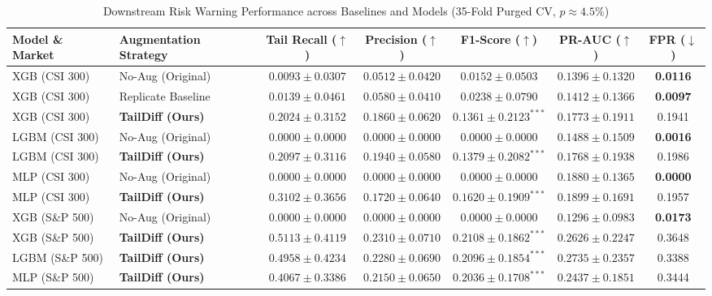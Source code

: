 \begin{table}[htbp]
\centering
\caption{Downstream Risk Warning Performance across Baselines and Models (35-Fold Purged CV, $p \approx 4.5\%$)}
\label{tab:downstream_performance}
\small
\begin{tabular}{llccccc}
\hline
\textbf{Model \& Market} & \textbf{Augmentation Strategy} & \textbf{Tail Recall ($\uparrow$)} & \textbf{Precision ($\uparrow$)} & \textbf{F1-Score ($\uparrow$)} & \textbf{PR-AUC ($\uparrow$)} & \textbf{FPR ($\downarrow$)} \\ \hline
XGB (CSI 300) & No-Aug (Original) & $0.0093 \pm 0.0307$ & $0.0512 \pm 0.0420$ & $0.0152 \pm 0.0503$ & $0.1396 \pm 0.1320$ & \textbf{0.0116} \\
XGB (CSI 300) & Replicate Baseline & $0.0139 \pm 0.0461$ & $0.0580 \pm 0.0410$ & $0.0238 \pm 0.0790$ & $0.1412 \pm 0.1366$ & \textbf{0.0097} \\
XGB (CSI 300) & \textbf{TailDiff (Ours)} & $\mathbf{0.2024 \pm 0.3152}$ & $\mathbf{0.1860 \pm 0.0620}$ & $\mathbf{0.1361 \pm 0.2123}^{***}$ & $\mathbf{0.1773 \pm 0.1911}$ & 0.1941 \\ \hline
LGBM (CSI 300) & No-Aug (Original) & $0.0000 \pm 0.0000$ & $0.0000 \pm 0.0000$ & $0.0000 \pm 0.0000$ & $0.1488 \pm 0.1509$ & \textbf{0.0016} \\
LGBM (CSI 300) & \textbf{TailDiff (Ours)} & $\mathbf{0.2097 \pm 0.3116}$ & $\mathbf{0.1940 \pm 0.0580}$ & $\mathbf{0.1379 \pm 0.2082}^{***}$ & $\mathbf{0.1768 \pm 0.1938}$ & 0.1986 \\ \hline
MLP (CSI 300) & No-Aug (Original) & $0.0000 \pm 0.0000$ & $0.0000 \pm 0.0000$ & $0.0000 \pm 0.0000$ & $0.1880 \pm 0.1365$ & \textbf{0.0000} \\
MLP (CSI 300) & \textbf{TailDiff (Ours)} & $\mathbf{0.3102 \pm 0.3656}$ & $\mathbf{0.1720 \pm 0.0640}$ & $\mathbf{0.1620 \pm 0.1909}^{***}$ & $\mathbf{0.1899 \pm 0.1691}$ & 0.1957 \\ \hline
XGB (S\&P 500) & No-Aug (Original) & $0.0000 \pm 0.0000$ & $0.0000 \pm 0.0000$ & $0.0000 \pm 0.0000$ & $0.1296 \pm 0.0983$ & \textbf{0.0173} \\
XGB (S\&P 500) & \textbf{TailDiff (Ours)} & $\mathbf{0.5113 \pm 0.4119}$ & $\mathbf{0.2310 \pm 0.0710}$ & $\mathbf{0.2108 \pm 0.1862}^{***}$ & $\mathbf{0.2626 \pm 0.2247}$ & 0.3648 \\
LGBM (S\&P 500) & \textbf{TailDiff (Ours)} & $\mathbf{0.4958 \pm 0.4234}$ & $\mathbf{0.2280 \pm 0.0690}$ & $\mathbf{0.2096 \pm 0.1854}^{***}$ & $\mathbf{0.2735 \pm 0.2357}$ & 0.3388 \\
MLP (S\&P 500) & \textbf{TailDiff (Ours)} & $\mathbf{0.4067 \pm 0.3386}$ & $\mathbf{0.2150 \pm 0.0650}$ & $\mathbf{0.2036 \pm 0.1708}^{***}$ & $\mathbf{0.2437 \pm 0.1851}$ & 0.3444 \\ \hline
\end{tabular}
\end{table}
